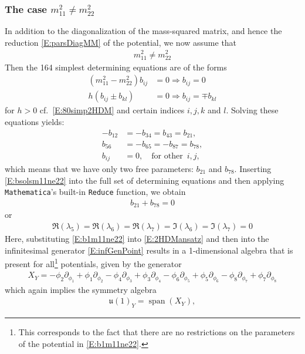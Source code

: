 \documentclass[a4paper,hidelinks, 12pt]{article}
\numberwithin{equation}{section}
\theoremstyle{plain}
\newcommand{\La}{\mathfrak}
\newcommand{\nn}{\nonumber}
\newcommand{\on}{\operatorname}
\begin{document}
\subsubsection{The case $m_{11}^2\ne m_{22}^2$}
\label{sec:TheCaseM112NeM222}
In addition to the diagonalization of the mass-squared matrix, and hence the reduction \eqref{E:parsDiagMM} of the potential, we now assume that
\begin{align}
	m_{11}^2\ne m_{22}^2
\end{align}
Then the 164 simplest determining  
equations are of the forms 
\begin{align}
	(m_{11}^2-m_{22}^2) b_{ij} &= 0 \Rightarrow b_{ij}=0  \\
	h(b_{ij}\pm b_{kl}) &=0 \Rightarrow b_{ij}=\mp b_{kl} \label{E:hbb=0}
\end{align}
 for $h>0$ cf.~\eqref{E:80simp2HDM} and certain indices $i,j,k$ and $l$. Solving these equations yields:
\begin{align}\label{E:bsolsm11ne22}
	-b_{12}&=-b_{34}=b_{43} = b_{21},  \nn \\
	b_{56}&=-b_{65}=-b_{87}= b_{78}, \nn \\
	b_{ij}&=0, \quad \text{for other}\;\: i,j, 	
\end{align}
which means that we have only two free parameters: $b_{21}$ and $b_{78}$.
Inserting \eqref{E:bsolsm11ne22} into the full set of determining equations and then applying \texttt{Mathematica}'s built-in \texttt{Reduce} function, we obtain 
\begin{align}\label{E:b1m11ne22}
	b_{21}+b_{78}=0 
\end{align}
 or 
\begin{align}\label{E:b2m11ne22}
		\Re(\lambda_5)=\Re(\lambda_6)=\Re(\lambda_7)=\Im(\lambda_6)=\Im(\lambda_7)=0
	\end{align}
Here, substituting \eqref{E:b1m11ne22}
 into \eqref{E:2HDMansatz} and then into
the infinitesimal generator \eqref{E:infGenPoint}
results in a 1-dimensional algebra that is present for all\footnote{This corresponds to the fact that there are no restrictions on the parameters of the potential in \eqref{E:b1m11ne22}.} potentials, given by the generator
\begin{align}
	X_Y= -\phi_2 \partial_{\phi_1}+\phi_1 \partial_{\phi_2}-\phi_4\partial_{\phi_3}+\phi_3\partial_{\phi_4}-\phi_6\partial_{\phi_5}+\phi_5\partial_{\phi_6}-\phi_8\partial_{\phi_7}+\phi_7\partial_{\phi_8}
\end{align}
which again implies the symmetry algebra 
\begin{align}
\La{u}(1)_Y=\on{span}(X_Y), 	
\end{align}
\end{document}

